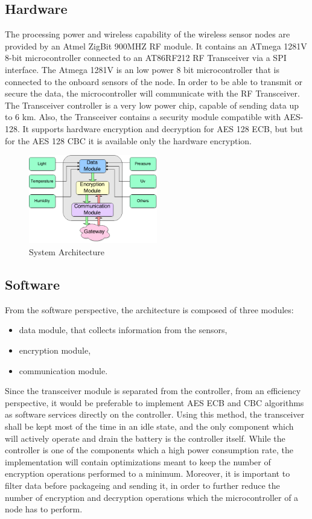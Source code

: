 \label{chap:arch}
\subsection{Hardware}

The processing power and wireless capability of the wireless sensor nodes are provided by an Atmel
ZigBit 900MHZ RF module. It contains an ATmega 1281V 8-bit microcontroller connected to an
AT86RF212 RF Transceiver via a SPI interface. The Atmega 1281V is an low power 8 bit microcontroller
that is connected to the onboard sensors of the node. In order to be able to transmit or secure the
data, the microcontroller will communicate with the RF Transceiver. The Transceiver controller is a very low power chip,
capable of sending data up to 6 km. Also, the Transceiver contains a security module compatible
with AES-128. It supports hardware encryption and decryption for AES 128 ECB, but but for the AES
128 CBC it is available only the hardware encryption.


\begin{figure}[ht] \centering
  \includegraphics[width=0.5\textwidth]{img/wsn-soa-system-arch.png}
  \caption{System Architecture}
\end{figure}

\subsection{Software}

From the software perspective, the architecture is composed of three modules:
\begin{itemize}
\item data module, that
collects information from the sensors,
\item encryption module,
\item communication module.
\end{itemize}

Since the transceiver module is separated from the controller, from an efficiency perspective, it 
would be preferable to implement AES ECB and CBC algorithms as software services directly on the 
controller. Using this method, the transceiver shall be kept most of the time in an idle state, 
and the only component which will actively operate and drain the battery is the controller itself.
While the controller is one of the components which a high power consumption rate, the implementation 
will contain optimizations meant to keep the number of encryption operations performed to a minimum.
Moreover, it is important to filter data before packageing and sending it, in order to further 
reduce the number of encryption and decryption operations which the microcontroller of a node has 
to perform.


